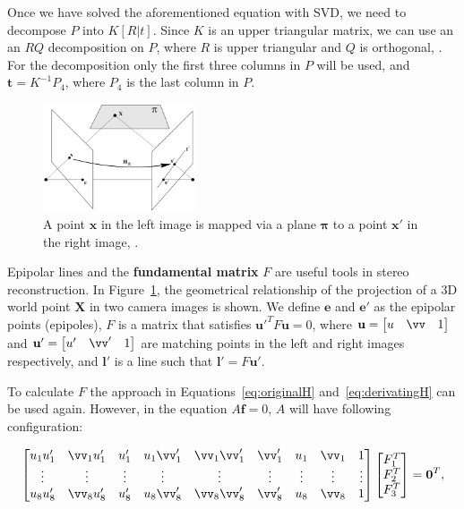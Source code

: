 \documentclass[12pt]{article}
\begin{document}
Once we have solved the aforementioned equation with SVD, we need to decompose $P$ into $K[R|t]$.
Since $K$ is an upper triangular matrix, we can use an an $RQ$ decomposition on $P$, where $R$ is upper triangular and $Q$ is orthogonal, \cite{Francis1961}.
For the decomposition only the first three columns in $P$ will be used, and $\mathbf{t} = K^{-1}P_4$, where $P_4$ is the last column in $P$.


\begin{figure}[htbp!]
	\centering
	\includegraphics[width=0.4\textwidth]{images/epipolarLines}
	\caption{A point $\mathbf{x}$ in the left image is mapped via a plane $\boldsymbol{\pi}$ to a point $\mathbf{x}'$ in the right image, \cite{Hartley2004}.}\label{fig:epipolarLines}
\end{figure}

Epipolar lines and the \textbf{fundamental matrix} $F$ are useful tools in stereo reconstruction.
In Figure~\ref{fig:epipolarLines}, the geometrical relationship of the projection of a 3D world point $\mathbf{X}$ in two camera images is shown.
We define $\mathbf{e}$ and $\mathbf{e}'$ as the epipolar points (epipoles), $F$ is a matrix that satisfies $\mathbf{u}'^TF\mathbf{u} = 0$, where $\mathbf{u} = \begin{bmatrix} u & \vv & 1 \end{bmatrix}$ and $\mathbf{u}' = \begin{bmatrix} u' & \vv' & 1 \end{bmatrix}$ are matching points in the left and right images respectively, and $\mathbf{l}'$ is a line such that $\mathbf{l}' = F\mathbf{u}'$.

To calculate $F$ the approach in Equations~\ref{eq:originalH} and~\ref{eq:derivatingH} can be used again.
However, in the equation $A\mathbf{f} = 0$, $A$ will have following configuration:

\begin{equation}
\begin{bmatrix}
u_1 u_1' & 	\vv_1 u_1' & u_1' & u_1 \vv_1' & \vv_1 \vv_1' & \vv_1' & u_1 & \vv_1 & 1 \\
\vdots & \vdots & \vdots & \vdots & \vdots & \vdots & \vdots & \vdots & \vdots  \\
u_8 u_8' & \vv_8 u_8' & u_8' & u_8 \vv_8' & \vv_8 \vv_8' & \vv_8' & u_8 & \vv_8 & 1 
\end{bmatrix}
\begin{bmatrix}
F_1^T \\
F_2^T \\
F_3^T \\
\end{bmatrix}
= \mathbf{0}^T,
\end{equation}
\end{document}
